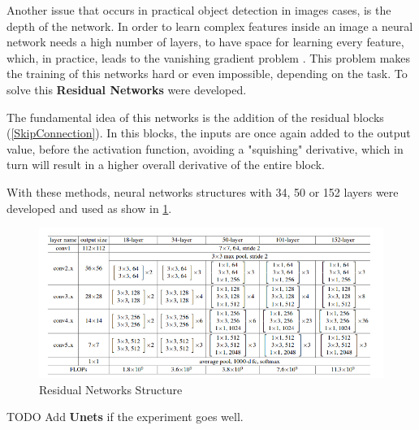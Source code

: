 Another issue that occurs in practical object detection in images cases, is the depth of the network. In order to learn complex features inside an image a neural network needs a high number of layers, to have space for learning every feature, which, in practice, leads to the vanishing gradient problem \cite{ResNetPaper}. This problem makes the training of this networks hard or even impossible, depending on the task. To solve this \textbf{Residual Networks} \cite{ResNetPaper} were developed.

The fundamental idea of this networks is the addition of the residual blocks (\ref{SkipConnection}). In this blocks, the inputs are once again added to the output value, before the activation function, avoiding a "squishing" derivative, which in turn will result in a higher overall derivative of the entire block.

With these methods, neural networks structures with 34, 50 or 152 layers were developed and used as show in \ref{ResNetExample}.

 \begin{figure}[H]
	\includegraphics[width=\textwidth]{Pictures/008ResNetExample.png}
	\caption{Residual Networks Structure \cite{ResNetPaper}}
	\label{ResNetExample}
\end{figure}



TODO Add \textbf{Unets} if the experiment goes well.